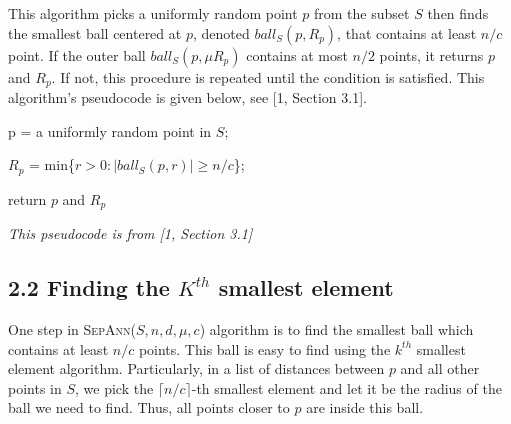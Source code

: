\documentclass[12pt,english,]{article}
\let\origfigure\figure
\let\endorigfigure\endfigure
\renewenvironment{figure}[1][2] {
    \expandafter\origfigure\expandafter[H]
} {
    \endorigfigure
}
\begin{document}
This algorithm picks a uniformly random point \(p\) from the subset
\(S\) then finds the smallest ball centered at \(p\), denoted
\(ball_S(p, R_p)\), that contains at least \(n/c\) point. If the outer
ball \(ball_S(p,\mu R_p)\) contains at most \(n/2\) points, it returns
\(p\) and \(R_p\). If not, this procedure is repeated until the
condition is satisfied. This algorithm's pseudocode is given below, see
{[}1, Section 3.1{]}.

\begin{figure}[ht]
  \centering
  \begin{minipage}{0.9\linewidth}
    {\LinesNotNumbered
    \begin{algorithm}[H]

    \DontPrintSemicolon
    \SetAlgoLined
    \BlankLine

    \centering
    \begin{minipage}{.80\linewidth}
      {p = a uniformly random point in $S$;

      $R_p$ = min\{$r > 0: |ball_S(p, r)| \geq n/c$\};}
      return $p$ and $R_p$
    \end{minipage}
    \caption{\textsc{SparseSepAnn}$(S,n,d,t)$}
    \end{algorithm}}
  \end{minipage}
  \begin{minipage}{0.90\textwidth}
    \begin{flushright}
    {\footnotesize \emph{This pseudocode is from [1, Section 3.1]}\par}
    \end{flushright}
  \end{minipage}
\end{figure}

\hypertarget{section2.2}{%
\subsection{\texorpdfstring{2.2 \enspace Finding the \(K^{th}\) smallest
element}{2.2 Finding the K\^{}\{th\} smallest element}}\label{section2.2}}

One step in \textsc{SepAnn($S,n,d,\mu,c$)} algorithm is to find the
smallest ball which contains at least \(n/c\) points. This ball is easy
to find using the \(k^{th}\) smallest element algorithm. Particularly,
in a list of distances between \(p\) and all other points in \(S\), we
pick the \(\lceil n/c\rceil\)-th smallest element and let it be the
radius of the ball we need to find. Thus, all points closer to \(p\) are
inside this ball.
\end{document}
